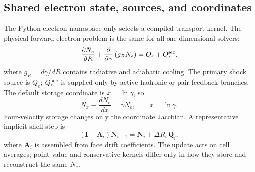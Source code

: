 \documentclass[twocolumn]{aastex702}
\begin{document}
\subsection{Shared electron state, sources, and coordinates}

The Python electron namespace only selects a compiled transport kernel.  The
physical forward-electron problem is the same for all one-dimensional solvers:
\begin{equation}
\frac{\partial N_e}{\partial R}
+\frac{\partial}{\partial\gamma}
\left(g_RN_e\right)
=Q_e+Q_e^{\rm sec},
\end{equation}
where \(g_R=d\gamma/dR\) contains radiative and adiabatic cooling.  The primary
shock source is \(Q_e\); \(Q_e^{\rm sec}\) is supplied only by active hadronic or
pair-feedback branches.  The default storage coordinate is \(x=\ln\gamma\), so
\begin{equation}
N_x\equiv\frac{dN_e}{dx}=\gamma N_e,
\qquad x=\ln\gamma .
\end{equation}
Four-velocity storage changes only the coordinate Jacobian.  A representative
implicit shell step is
\begin{equation}
\left(\mathbf{I}-\mathbf{A}_i\right)\mathbf{N}_{i+1}
=\mathbf{N}_{i}+\Delta R_i\,\mathbf{Q}_{i},
\end{equation}
where \(\mathbf{A}_i\) is assembled from face drift coefficients.  The update
acts on cell averages; point-value and conservative kernels differ only in how
they store and reconstruct the same \(N_e\).
\end{document}
